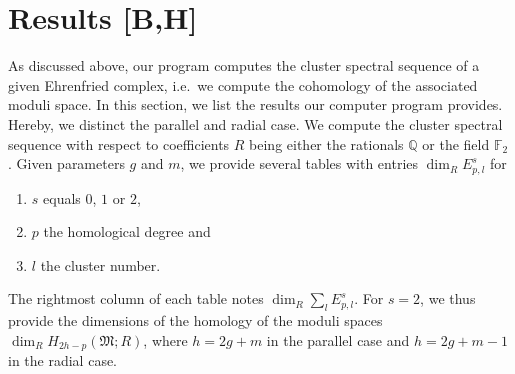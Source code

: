\section{Results [B,H]}
\label{program:results}

As discussed above, our program computes the cluster spectral sequence of a given Ehrenfried complex, i.e.\ we compute the cohomology of the associated moduli space.
In this section, we list the results our computer program provides.
Hereby, we distinct the parallel and radial case.
We compute the cluster spectral sequence with respect to coefficients $R$ being either the rationals $\mathbb Q$ or the field $\mathbb F_2$.
Given parameters $g$ and $m$, we provide several tables with entries $\dim_R E^s_{p,l}$ for
\begin{enumerate}
    \item $s$ equals $0$, $1$ or $2$,
    \item $p$ the homological degree and
    \item $l$ the cluster number.
\end{enumerate}
The rightmost column of each table notes $\dim_R \sum_{l} E^s_{p,l}$.
For $s=2$, we thus provide the dimensions of the homology of the moduli spaces $\dim_R H_{2h-p}(\mathfrak M;R)$,
where $h = 2g+m$ in the parallel case and $h = 2g + m -1$ in the radial case.


